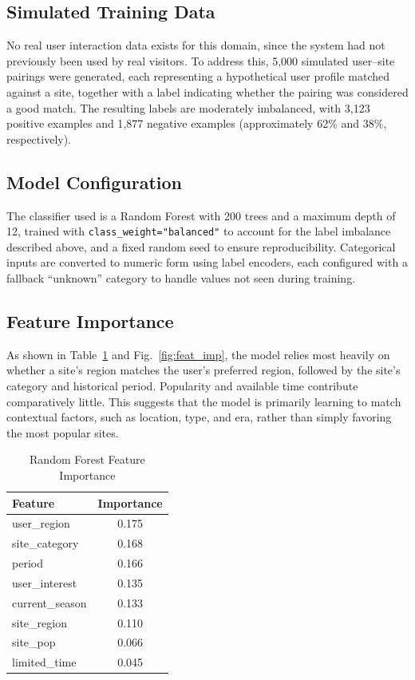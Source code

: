 \documentclass[conference]{IEEEtran}
\begin{document}
\subsection{Simulated Training Data}
No real user interaction data exists for this domain, since the system had not previously been used by real visitors. To address this, 5{,}000 simulated user--site pairings were generated, each representing a hypothetical user profile matched against a site, together with a label indicating whether the pairing was considered a good match. The resulting labels are moderately imbalanced, with 3{,}123 positive examples and 1{,}877 negative examples (approximately 62\% and 38\%, respectively).

\subsection{Model Configuration}
The classifier used is a Random Forest with 200 trees and a maximum depth of 12, trained with \texttt{class\_weight="balanced"} to account for the label imbalance described above, and a fixed random seed to ensure reproducibility. Categorical inputs are converted to numeric form using label encoders, each configured with a fallback ``unknown'' category to handle values not seen during training.

\subsection{Feature Importance}
As shown in Table~\ref{tab:feat_imp} and Fig.~\ref{fig:feat_imp}, the model relies most heavily on whether a site's region matches the user's preferred region, followed by the site's category and historical period. Popularity and available time contribute comparatively little. This suggests that the model is primarily learning to match contextual factors, such as location, type, and era, rather than simply favoring the most popular sites.

\begin{table}[htbp]
\caption{Random Forest Feature Importance}
\label{tab:feat_imp}
\centering
\begin{tabular}{lc}
\toprule
Feature & Importance \\
\midrule
user\_region & 0.175 \\
site\_category & 0.168 \\
period & 0.166 \\
user\_interest & 0.135 \\
current\_season & 0.133 \\
site\_region & 0.110 \\
site\_pop & 0.066 \\
limited\_time & 0.045 \\
\bottomrule
\end{tabular}
\end{table}
\end{document}
